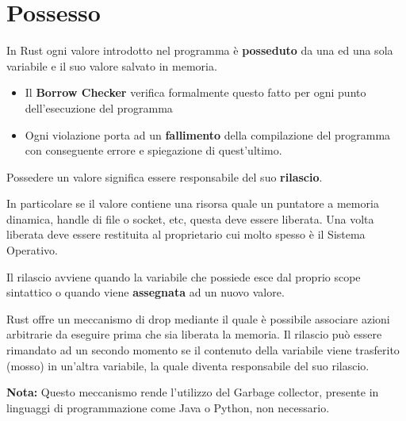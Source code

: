 \section{Possesso}

In Rust ogni valore introdotto nel programma è \textbf{posseduto} da una ed una sola variabile e il suo valore salvato in memoria.
\begin{itemize}
  \item Il \textbf{Borrow Checker} verifica formalmente questo fatto per ogni punto dell'esecuzione del programma
  \item Ogni violazione porta ad un \textbf{fallimento} della compilazione del programma con conseguente errore e spiegazione di quest'ultimo.
\end{itemize}

Possedere un valore significa essere responsabile del suo \textbf{rilascio}.

In particolare se il valore contiene una risorsa quale un puntatore a memoria dinamica, handle di file o socket, etc, questa deve essere liberata. Una volta liberata deve essere restituita al proprietario cui molto spesso è il Sistema Operativo.

Il rilascio avviene quando la variabile che possiede  esce dal proprio scope sintattico o quando viene \textbf{assegnata} ad un nuovo valore.

Rust offre un meccanismo di drop mediante il quale è possibile associare azioni arbitrarie da eseguire prima che sia liberata la memoria.
Il rilascio può essere rimandato ad un secondo momento se il contenuto della variabile viene trasferito (mosso) in un'altra variabile, la quale diventa responsabile del suo rilascio.\newline



\noindent
\begin{tcolorbox}
  \textbf{Nota:} Questo meccanismo rende l'utilizzo del Garbage collector, presente in linguaggi di programmazione come Java o Python, non necessario.
\end{tcolorbox}




